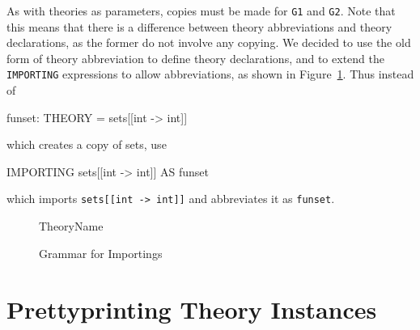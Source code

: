 \documentclass[11pt,twoside,openright,titlepage]{cslreport}
\begin{document}
As with theories as parameters, copies must be made for \texttt{G1} and
\texttt{G2}.  Note that this means that there is a difference between
theory abbreviations and theory declarations, as the former do not involve
any copying.  We decided to use the old form of theory abbreviation to
define theory declarations, and to extend the \texttt{IMPORTING} expressions to
allow abbreviations, as shown in Figure~\ref{importing-bnf}.  Thus instead of
\begin{session}
funset: THEORY = sets[[int -> int]]
\end{session}
\noindent which creates a copy of sets, use
\begin{session}
IMPORTING sets[[int -> int]] AS funset
\end{session}
\noindent which imports \texttt{sets[[int -> int]]} and abbreviates it as
\texttt{funset}.

\begin{figure}
\setlength{\sessionboxwidth}{\linewidth}
\addtolength{\sessionboxwidth}{-\arrayrulewidth}
\addtolength{\sessionboxwidth}{-\tabcolsep}
\begin{boxedminipage}[b]{\sessionboxwidth}
\begin{bnf}

{ }

{TheoryName }

\end{bnf}
\end{boxedminipage}
\caption{Grammar for Importings}\label{importing-bnf}
\end{figure}

\chapter{Prettyprinting Theory Instances}
\end{document}
